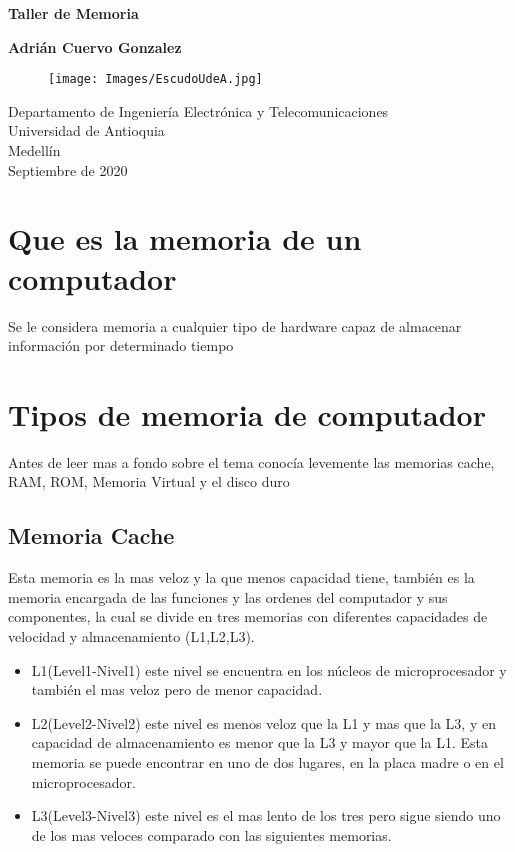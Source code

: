 \documentclass{article}
\begin{document}
	
	\begin{titlepage}
		\begin{center}
			\vspace*{1cm}
			
			\Huge
			\textbf{Taller de Memoria}
			
			\vspace{0.5cm}
			\LARGE
			
			\vspace{1.5cm}
			
			\textbf{Adrián Cuervo Gonzalez}
			\vfill
			\begin{figure}[h]
				\texttt{[image: Images/EscudoUdeA.jpg]}
				\centering
				\label{fig:EscudoUdeA}
			\end{figure}
			
			\vspace{0.8cm}
			
			\Large
			Departamento de Ingeniería Electrónica y Telecomunicaciones\\
			Universidad de Antioquia\\
			Medellín\\
			Septiembre de 2020
			
		\end{center}
	\end{titlepage}
	
	\tableofcontents
	\newpage
	\section{Que es la memoria de un computador}\label{intro}
	Se le considera memoria a cualquier tipo de hardware capaz de almacenar información por determinado tiempo
	
	\section{Tipos de memoria de computador} \label{contenido}
	Antes de leer mas a fondo sobre el tema conocía levemente las memorias cache, RAM, ROM, Memoria Virtual y el disco duro
	\subsection{Memoria Cache}
	Esta memoria es la mas veloz y la que menos capacidad tiene, también es la memoria encargada de las funciones y las ordenes del computador y sus componentes, la cual se divide en tres memorias con diferentes capacidades de velocidad y almacenamiento  (L1,L2,L3).
	\begin{itemize}
		\item{L1(Level1-Nivel1) este nivel se encuentra en los núcleos de microprocesador y también el mas veloz pero de menor capacidad.}
		\item{L2(Level2-Nivel2) este nivel es menos veloz que la L1 y mas que la L3, y en capacidad de almacenamiento es menor que la L3 y mayor que la L1. Esta memoria se puede encontrar en uno de dos lugares, en la placa madre o en el microprocesador.}
		\item {L3(Level3-Nivel3) este nivel es el mas lento de los tres pero sigue siendo uno de los mas veloces comparado con las siguientes memorias.}
	\end{itemize}
	
\end{document}
